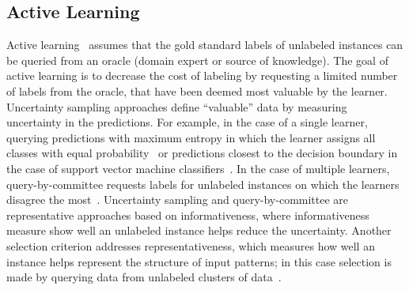 \subsection{Active Learning}
Active learning~\cite{zhou2017brief} assumes that the gold standard labels of unlabeled instances can be queried from an oracle (domain expert or source of knowledge).
The goal of active learning is to decrease the cost of labeling by requesting a limited number of labels from the oracle, that have been deemed most valuable by the learner.
Uncertainty sampling approaches define ``valuable'' data by measuring uncertainty in the predictions.
For example, in the case of a single learner, querying predictions with maximum entropy in which the learner assigns all classes with equal probability~\cite{lewis1994heterogeneous} or predictions closest to the decision boundary in the case of support vector machine classifiers~\cite{campbell2000query}.
In the case of multiple learners, query-by-committee requests labels for unlabeled instances on which the learners disagree the most~\cite{seung1992query}.
Uncertainty sampling and query-by-committee are representative approaches based on informativeness, where informativeness measure show well an unlabeled instance helps reduce the uncertainty. 
Another selection criterion addresses representativeness, which measures how well an instance helps represent the structure of input patterns; in this case selection is made by querying data from unlabeled clusters of data~\cite{nguyen2004active,dasgupta2008hierarchical}.

